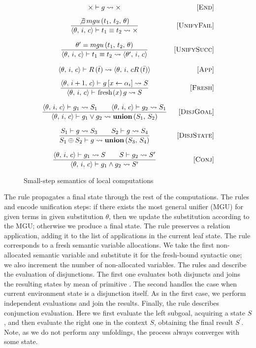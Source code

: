 \begin{figure}[t]
\[\begin{array}{cr}
{\times \vdash g \leadsto \times}
&     \ruleno{End} \\[3mm]
\dfrac{\not\exists \, mgu\,(t_1,\, t_2,\, \theta)}
      {\inbr{\theta,\, i,\, c} \vdash t_1 \equiv t_2 \leadsto \times}
&     \ruleno{UnifyFail}  \\[6mm]
\dfrac{\theta^\prime = mgu\,(t_1,\, t_2,\, \theta)}
      {\inbr{\theta,\, i,\, c} \vdash t_1 \equiv t_2 \leadsto \inbr{\theta^\prime,\, i,\, c}}
&     \ruleno{UnifySucc}  \\[6mm]
      {\inbr{\theta,\, i,\, c} \vdash R\,(\bar{t}) \leadsto \inbr{\theta,\, i,\,cR\,(\bar{t})}}
&     \ruleno{App} \\[3mm]
\dfrac{\inbr{\theta,\, i+1,\, c} \vdash g\,[x \leftarrow \alpha_i] \leadsto S}
      {\inbr{\theta,\, i,\, c} \vdash \mbox{\lstinline|fresh|} (x)\, g \leadsto S}
&     \ruleno{Fresh}  \\[6mm]
\dfrac{\inbr{\theta,\, i,\, c} \vdash g_1 \leadsto S_1 \qquad \inbr{\theta,\, i,\, c} \vdash g_2 \leadsto S_1}
      {\inbr{\theta,\, i,\, c} \vdash g_1 \lor g_2 \leadsto \primi{union}\,(S_1,\, S_2)}
&     \ruleno{DisjGoal}  \\[6mm]
\dfrac{S_1 \vdash g \leadsto S_3 \qquad S_2 \vdash g \leadsto S_4}
      {S_1 \oplus S_2 \vdash g \leadsto \primi{union}\,(S_3,\, S_4)}
&     \ruleno{DisjState}  \\[6mm]
\dfrac{\inbr{\theta,\, i,\, c} \vdash g_1 \leadsto S \qquad S \vdash g_2 \leadsto S^\prime}
      {\inbr{\theta,\, i,\, c} \vdash g_1 \land g_2 \leadsto S^\prime}
&     \ruleno{Conj}
\end{array}\]
\caption{Small-step semantics of local computations}
\label{fair:unfolding-semantics}
\end{figure}

The rule  propagates a final state through the rest of the computations. The rules  and  encode unification steps: if there exists the most general
unifier (MGU) for given terms in given substitution $\theta$, then we update the substitution according to the MGU; otherwise we produce a final state. The rule  preserves a relation
application, adding it to the list of applications in the current leaf state. The rule  corresponds to a fresh semantic variable allocations. We take the first non-allocated semantic
variable and substitute it for the fresh-bound syntactic one; we also increment the number of non-allocated variables. The rules  and  describe the evaluation
of disjunctions. The first one evaluates both disjuncts and joins the resulting states by mean of primitive . The second handles the case when current environment state is a disjunction
itself. As in the first case, we perform independent evaluations and join the results. Finally, the rule  describes conjunction evaluation. Here we first evaluate the left subgoal,
acquiring a state $S$, and then evaluate the right one in the context $S$, obtaining the final result $S^\prime$. Note, as we do not perform any unfoldings, the process always converges with
some state.

